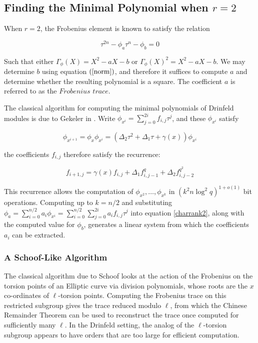 \subsection{Finding the Minimal Polynomial when $r = 2$}
When $r = 2$, the Frobenius element is known to satisfy the relation

\begin{equation}\label{charrank2}
    \tau^{2n} - \phi_{a}\tau^n - \phi_b = 0
\end{equation}

Such that either $\Gamma_{\phi}(X) = X^2 - aX - b$ or $\Gamma_{\phi}(X)^2 = X^2 - aX - b$. We may determine $b$ using equation $(\ref{norm})$, and therefore it suffices to compute $a$ and determine whether the resulting polynomial is a square. The coefficient $a$ is referred to as the $\textit{Frobenius trace}$.

The classical algorithm for computing the minimal polynomials of Drinfeld modules is due to Gekeler in \cite{frobdist}. Write $\phi_{x^i} = \sum_{j=0}^{2i}f_{i,j}\tau^j$, and these $\phi_{x^i}$ satisfy

\begin{equation*}
    \phi_{x^{i+1}} = \phi_{x}\phi_{x^i} = (\Delta_2 \tau^2 + \Delta_1 \tau + \gamma(x))\phi_{x^i}
\end{equation*}

the coefficients $f_{i,j}$ therefore satisfy the recurrence:

\begin{equation}
 f_{i+1, j} =  \gamma(x)f_{i,j} + \Delta_1f_{i,j-1}^{q} + \Delta_2 f_{i, j-2}^{q^2}  
\end{equation}

This recurrence allows the computation of $\phi_{x^2}, \ldots, \phi_{x^k}$ in $(k^2n\log^2q)^{1+o(1)}$ bit operations. Computing up to $k = n/2$ and substituting $\phi_a = \sum_{i=0}^{n/2} a_i \phi_{x^i} = \sum_{i=0}^{n/2}\sum_{j = 0}^{2i} a_i f_{i,j}\tau^{j}$ into equation \ref{charrank2}, along with the computed value for $\phi_b$, generates a linear system from which the coefficients $a_i$ can be extracted.

\subsubsection{A Schoof-Like Algorithm}

The classical algorithm due to Schoof \cite{schoof85} looks at the action of the Frobenius on the torsion points of an Elliptic curve via division polynomials, whose roots are the $x$ co-ordinates of $\ell$-torsion points. Computing the Frobenius trace on this restricted subgroup gives the trace reduced modulo $\ell$, from which the Chinese Remainder Theorem can be used to reconstruct the trace once computed for sufficiently many $\ell$. In the Drinfeld setting, the analog of the $\ell$-torsion subgroup appears to have orders that are too large for efficient computation.

